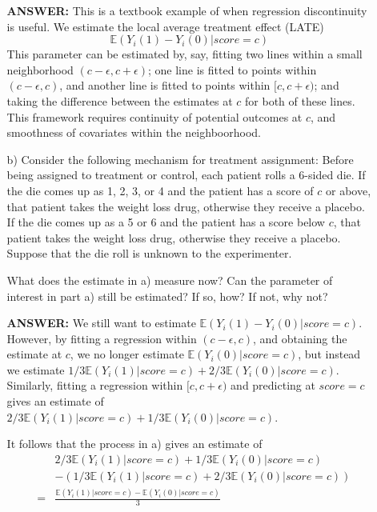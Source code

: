 \documentclass{article}
\newcommand{\E}[0]{\mathbb{E}}
\begin{document}
\begin{itemize}
\begin{itemize}
          \textbf{ANSWER:}  This is a textbook example of when regression discontinuity
            is useful.
            We estimate the local average treatment effect (LATE)
            $$
              \E(Y_i(1) - Y_i(0)| score = c)
            $$
            This parameter can be estimated by, say, fitting two lines within a small
            neighborhood $(c-\epsilon, c + \epsilon)$;  
            one line is fitted to points within $(c-\epsilon, c)$, and another line is fitted to
            points within $[c, c + \epsilon)$; and taking the difference between
            the estimates at $c$ for both of these lines.
            This framework requires continuity of potential outcomes at $c$, and
            smoothness of covariates within the neighboorhood.
        \item[b)]
          Consider the following mechanism for treatment assignment:
          Before being assigned to treatment or control, each patient rolls a 6-sided die.
          If the die comes up as 1, 2, 3, or 4 and the patient has a score of $c$ or above,
          that patient takes the weight loss drug, otherwise they receive a placebo.
          If the die comes up as a 5 or 6 and the patient has a score below $c$,
          that patient takes the weight loss drug, otherwise they receive a placebo.
          Suppose that the die roll is unknown to the experimenter.
          
          What does the estimate in a) measure now?
          Can the parameter of interest in part a) still be estimated?
          If so, how?  If not, why not?
          
          \textbf{ANSWER:}  We still want to estimate $\E(Y_i(1) - Y_i(0)| score = c)$.
            However, by fitting a regression within $(c-\epsilon, c)$, and obtaining the
            estimate at $c$, we no longer estimate
           $\E(Y_i(0)| score = c)$, but instead we estimate 
           $1/3\E(Y_i(1)| score = c) + 2/3\E(Y_i(0)| score = c)$.
           Similarly, fitting a regression within $[c, c +\epsilon)$ and predicting at $score = c$
           gives an estimate of $2/3\E(Y_i(1)| score = c) + 1/3\E(Y_i(0)| score = c)$.
           
           It follows that the process in a) gives an estimate of
           \begin{eqnarray*}
             && 2/3\E(Y_i(1)| score = c) + 1/3\E(Y_i(0)| score = c)\\
             &&- (1/3\E(Y_i(1)| score = c) + 2/3\E(Y_i(0)| score = c)) \\
             &=& \frac{\E(Y_i(1)| score = c) - \E(Y_i(0)| score = c)}{3}
           \end{eqnarray*}
           

\end{itemize}
\end{itemize}
\end{document}
